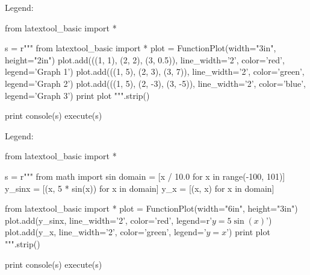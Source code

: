 \newpage
Legend:
\begin{python}
from latextool_basic import *

s = r"""
from latextool_basic import *
plot = FunctionPlot(width="3in", height="2in")
plot.add(((1, 1), (2, 2), (3, 0.5)), line_width='2', color='red', legend='Graph 1')
plot.add(((1, 5), (2, 3), (3, 7)), line_width='2', color='green', legend='Graph 2')
plot.add(((1, 5), (2, -3), (3, -5)), line_width='2', color='blue', legend='Graph 3')
print plot
""".strip()

print console(s)
execute(s)
\end{python}



\newpage
Legend:
\begin{python}
from latextool_basic import *

s = r"""
from math import sin
domain = [x / 10.0 for x in range(-100, 101)]
y_sinx = [(x, 5 * sin(x)) for x in domain]
y_x = [(x, x) for x in domain]

from latextool_basic import *
plot = FunctionPlot(width="6in", height="3in")
plot.add(y_sinx, line_width='2', color='red', legend=r'$y = 5 \sin(x)$')
plot.add(y_x, line_width='2', color='green', legend='$y = x$')
print plot
""".strip()

print console(s)
execute(s)
\end{python}
